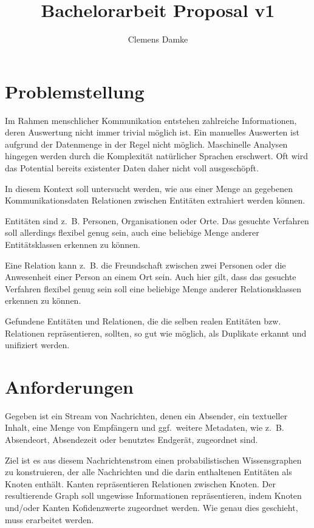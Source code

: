 \documentclass[12pt,a4paper,bibliography=totocnumbered,listof=totocnumbered]{scrartcl}
\title{Bachelorarbeit Proposal v1}
\author{Clemens Damke}
\begin{document}
{ \maketitle}

\section{Problemstellung}

Im Rahmen menschlicher Kommunikation entstehen zahlreiche Informationen, deren Auswertung nicht immer trivial möglich ist. Ein manuelles Auswerten ist aufgrund der Datenmenge in der Regel nicht möglich. Maschinelle Analysen hingegen werden durch die Komplexität natürlicher Sprachen erschwert. Oft wird das Potential bereits existenter Daten daher nicht voll ausgeschöpft.

In diesem Kontext soll untersucht werden, wie aus einer Menge an gegebenen Kommunikationsdaten Relationen zwischen Entitäten extrahiert werden können.

Entitäten sind z.~B. Personen, Organisationen oder Orte. Das gesuchte Verfahren soll allerdings flexibel genug sein, auch eine beliebige Menge anderer Entitätsklassen erkennen zu können.

Eine Relation kann z.~B. die Freundschaft zwischen zwei Personen oder die Anwesenheit einer Person an einem Ort sein. Auch hier gilt, dass das gesuchte Verfahren flexibel genug sein soll eine beliebige Menge anderer Relationsklassen erkennen zu können.

Gefundene Entitäten und Relationen, die die selben realen Entitäten bzw. Relationen repräsentieren, sollten, so gut wie möglich, als Duplikate erkannt und unifiziert werden.


\section{Anforderungen}

Gegeben ist ein Stream von Nachrichten, denen ein Absender, ein textueller Inhalt, eine Menge von Empfängern und ggf.\ weitere Metadaten, wie z.~B. Absendeort, Absendezeit oder benutztes Endgerät, zugeordnet sind.

Ziel ist es aus diesem Nachrichtenstrom einen probabilistischen Wissensgraphen zu konstruieren, der alle Nachrichten und die darin enthaltenen Entitäten als Knoten enthält. Kanten repräsentieren Relationen zwischen Knoten. Der resultierende Graph soll ungewisse Informationen repräsentieren, indem Knoten und/oder Kanten Kofidenzwerte zugeordnet werden. Wie genau dies geschieht, muss erarbeitet werden.
\end{document}
